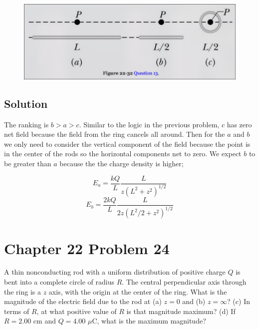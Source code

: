 \documentclass{article}
\begin{document}
\begin{figure}[ht]
    \centering
    \includegraphics[scale=0.4]{image-4.png}
\end{figure}

\subsection*{Solution}
The ranking is $b > a > c$. Similar to the logic in the previous problem, $c$ has zero net field because the field from the ring cancels all around. Then for the $a$ and $b$ we only need to consider the vertical component of the field because the point is in the center of the rods so the horizontal components net to zero. We expect $b$ to be greater than $a$ because the the charge density is higher;

\[
	E_a = \frac{kQ}{L} \frac{L}{z\left(L^2 + z^2\right)^{1/2}}
\]
\[
	E_b = \frac{2kQ}{L} \frac{L}{2z\left(L^2/2 + z^2\right)^{1/2}}
\]
\section*{Chapter 22 Problem 24}
A thin nonconducting rod with a uniform distribution of positive charge $Q$ is bent into a complete circle of radius $R$. The central perpendicular axis through the ring is a $z$ axis, with the origin at the center of the ring. What is the magnitude of the electric field due to the rod at (a) $z = 0$ and (b) $z = \infty$? (c) In terms of $R$, at what positive value of $R$ is that magnitude maximum? (d) If $R = 2.00$ cm and $Q = 4.00$ $\mu$C, what is the maximum magnitude?
\end{document}

